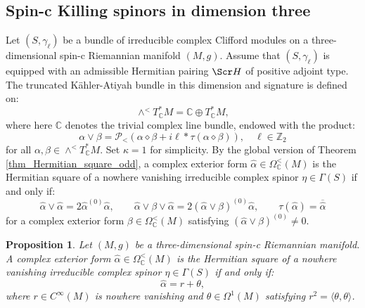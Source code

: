 \documentclass[10pt,a4paper,twoside,reqno]{amsart}
\theoremstyle{plain}
\newtheorem{prop}[thm]{Proposition}
\theoremstyle{definition}
\theoremstyle{remark}
\def\Z{\mathbb{Z}}
\def\C{\mathbb{C}}
\def\scS{\Scr H}
\def\cP{\mathcal{P}}
\def\cP{\mathcal{P}}
\newcommand{\escal}[1]{\langle#1\rangle}
\begin{document}

\subsection{Spin-c Killing spinors in dimension three}


Let $(S,\gamma_\ell)$ be a bundle of irreducible complex Clifford modules on a three-dimensional spin-c Riemannian manifold $(M,g)$. Assume that $(S,\gamma_\ell)$ is equipped with an admissible Hermitian pairing $\scS$ of positive adjoint type. The truncated Kähler-Atiyah bundle in this dimension and signature is defined on: $$\wedge^<T^*_\C M=\C\oplus T^*_\C M,$$ where here $\C$ denotes the trivial complex line bundle, endowed with the product: $$\alpha\vee\beta=\cP_<(\alpha\diamond\beta+i\ell*\tau(\alpha\diamond\beta)),\quad \ell\in\Z_2$$ for all $\alpha,\beta\in\wedge^<T^*_\C M$. Set $\kappa=1$ for simplicity. By the global version of Theorem \ref{thm_Hermitian_square_odd}, a complex exterior form $\widehat{\alpha}\in\Omega^<_\C(M)$ is the Hermitian square of a nowhere vanishing irreducible complex spinor $\eta\in\Gamma(S)$ if and only if: $$\widehat{\alpha}\vee\widehat{\alpha}=2\widehat{\alpha}^{(0)}\widehat{\alpha},\qquad \widehat{\alpha}\vee\beta\vee\widehat{\alpha}=2(\widehat{\alpha}\vee\beta)^{(0)}\widehat{\alpha},\qquad \tau(\widehat{\alpha})=\overline{\widehat{\alpha}}$$ for a complex exterior form $\beta\in\Omega^<_\C(M)$ satisfying $(\widehat{\alpha}\vee\beta)^{(0)}\neq0$.

\begin{prop}\label{prop:square_(3,0)}
    Let $(M,g)$ be a three-dimensional spin-c Riemannian manifold. A complex exterior form $\widehat{\alpha}\in\Omega^<_\C(M)$ is the Hermitian square of a nowhere vanishing irreducible complex spinor $\eta\in\Gamma(S)$ if and only if: $$\widehat{\alpha}=r+\theta,$$ where $r\in C^\infty(M)$ is nowhere vanishing and $\theta\in\Omega^1(M)$ satisfying $r^2=\escal{\theta,\theta}$.
\end{prop}
\end{document}

